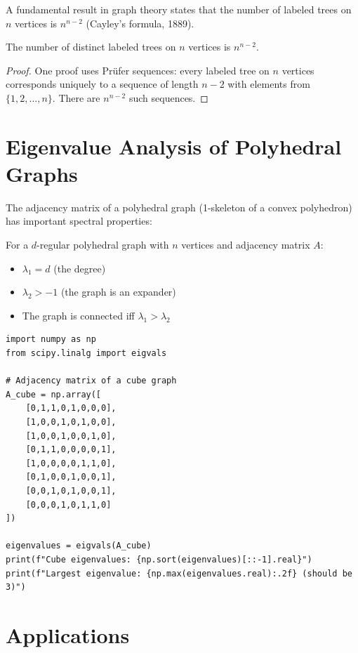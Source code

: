 A fundamental result in graph theory states that the number of labeled trees on $n$ vertices
is $n^{n-2}$ (Cayley's formula, 1889).

\begin{theorem}
The number of distinct labeled trees on $n$ vertices is $n^{n-2}$.
\end{theorem}

\begin{proof}
One proof uses Pr\"{u}fer sequences: every labeled tree on $n$ vertices corresponds uniquely
to a sequence of length $n-2$ with elements from $\{1, 2, \ldots, n\}$. There are $n^{n-2}$
such sequences.
\end{proof}

\section{Eigenvalue Analysis of Polyhedral Graphs}

The adjacency matrix of a polyhedral graph (1-skeleton of a convex polyhedron) has
important spectral properties:

\begin{theorem}
For a $d$-regular polyhedral graph with $n$ vertices and adjacency matrix $A$:
\begin{itemize}
\item $\lambda_1 = d$ (the degree)
\item $\lambda_2 > -1$ (the graph is an expander)
\item The graph is connected iff $\lambda_1 > \lambda_2$
\end{itemize}
\end{theorem}

\begin{lstlisting}[caption={Eigenvalue analysis of polyhedral graphs}, label=lst:eigenvalue_poly]
import numpy as np
from scipy.linalg import eigvals

# Adjacency matrix of a cube graph
A_cube = np.array([
    [0,1,1,0,1,0,0,0],
    [1,0,0,1,0,1,0,0],
    [1,0,0,1,0,0,1,0],
    [0,1,1,0,0,0,0,1],
    [1,0,0,0,0,1,1,0],
    [0,1,0,0,1,0,0,1],
    [0,0,1,0,1,0,0,1],
    [0,0,0,1,0,1,1,0]
])

eigenvalues = eigvals(A_cube)
print(f"Cube eigenvalues: {np.sort(eigenvalues)[::-1].real}")
print(f"Largest eigenvalue: {np.max(eigenvalues.real):.2f} (should be 3)")
\end{lstlisting}

\section{Applications}

